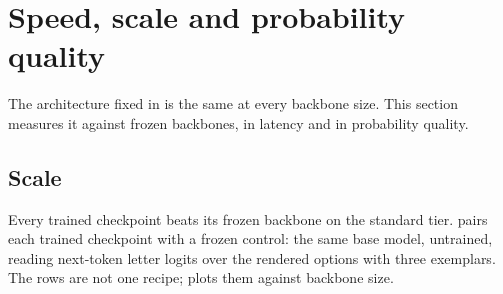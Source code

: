 \section{Speed, scale and probability quality}
\label{sec:scale}

The architecture fixed in  is the same at every backbone size. This
section measures it against frozen backbones, in latency and in probability quality.

\subsection{Scale}
\label{sec:results:scaling}

Every trained checkpoint beats its frozen backbone on the standard tier.  pairs each
trained checkpoint with a frozen control: the same base model, untrained, reading next-token letter
logits over the rendered options with three exemplars. The rows are not one recipe;
 plots them against backbone size.

